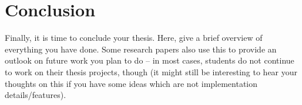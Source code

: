 \chapter{Conclusion}
Finally, it is time to conclude your thesis.
Here, give a brief overview of everything you have done.
Some research papers also use this to provide an outlook on future work you plan to do – in most cases, students do not continue to work on their thesis projects, though (it might still be interesting to hear your thoughts on this if you have some ideas which are not implementation details/features).